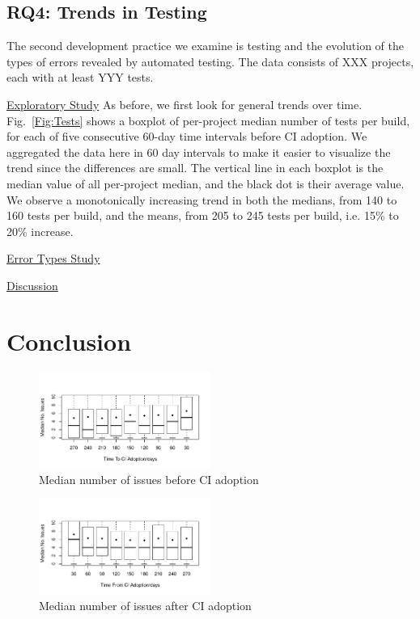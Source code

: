 \documentclass[conference]{IEEEtran}
\begin{document}
\subsection{RQ4: Trends in Testing}

The second development practice we examine is testing and the evolution of the types of errors revealed by automated testing.
The data consists of XXX projects, each with at least YYY tests.

\noindent \underline{Exploratory Study} As before, we first look for general trends over time.
Fig.~\ref{Fig:Tests} shows a boxplot of per-project median number of tests per build, for each of five consecutive 60-day time intervals before CI adoption.
We aggregated the data here in 60 day intervals to make it easier to visualize the trend since the differences are small.
The vertical line in each boxplot is the median value of all per-project median, and the black dot is their average value.
We observe a monotonically increasing trend in both the medians, from 140 to 160 tests per build, and the means, from 205 to 245 tests per build, i.e. 15\% to 20\% increase. 

\noindent \underline{Error Types Study}

\noindent \underline{Discussion}



\section{Conclusion}

\begin{figure}[!t]
\centering
\includegraphics[width=0.5\textwidth]{issues_before.pdf}
\caption{Median number of issues before CI adoption}
\label{Fig:IssuesBefore}
\end{figure}


\begin{figure}[!t]
\centering
\includegraphics[width=0.5\textwidth]{issues_after.pdf}
\caption{Median number of issues after CI adoption}
\label{Fig:IssuesAfter}
\end{figure}
\end{document}

